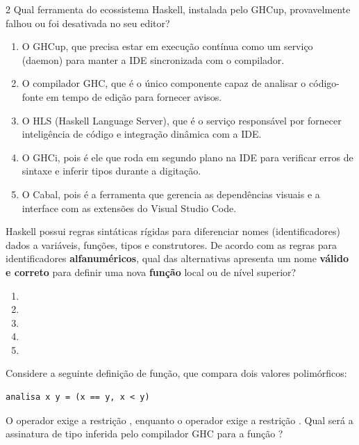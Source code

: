 \documentclass[a4paper,10pt,brazil]{article}
\begin{document}
\begin{multicols}{2}
Qual ferramenta do ecossistema Haskell, instalada pelo GHCup, provavelmente falhou ou foi desativada no seu editor?

\begin{enumerate}
  \item O GHCup, que precisa estar em execução contínua como um serviço (daemon) para manter a IDE sincronizada com o compilador.

  \item O compilador GHC, que é o único componente capaz de analisar o código-fonte em tempo de edição para fornecer avisos.

  \item O HLS (Haskell Language Server), que é o serviço responsável por fornecer inteligência de código e integração dinâmica com a IDE.

  \item O GHCi, pois é ele que roda em segundo plano na IDE para verificar erros de sintaxe e inferir tipos durante a digitação.

  \item O Cabal, pois é a ferramenta que gerencia as dependências visuais e a interface com as extensões do Visual Studio Code.


\end{enumerate}

Haskell possui regras sintáticas rígidas para diferenciar nomes (identificadores) dados a variáveis, funções, tipos e construtores. De acordo com as regras para identificadores \textbf{alfanuméricos}, qual das alternativas apresenta um nome \textbf{válido e correto} para definir uma nova \textbf{função} local ou de nível superior?

\begin{enumerate}
  \item {}

  \item {}

  \item {}

  \item {}

  \item {}

\end{enumerate}

Considere a seguinte definição de função, que compara dois valores polimórficos:
\begin{verbatim}
analisa x y = (x == y, x < y)
\end{verbatim}
O operador \haskellinline{==} exige a restrição , enquanto o operador \haskellinline{<} exige a restrição . Qual será a assinatura de tipo inferida pelo compilador GHC para a função ?


\end{multicols}
\end{document}
